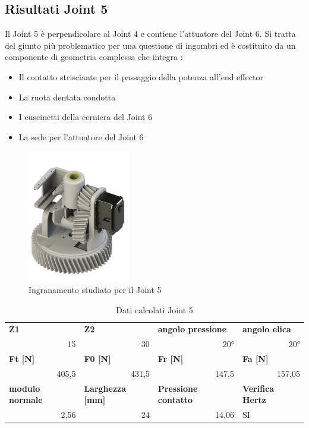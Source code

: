 \documentclass[%
corpo=11pt,
twoside,
 stile=classica,
oldstyle,
greek,%
]{toptesi}
\begin{document}
		\subsection{Risultati Joint 5}
		Il Joint 5 è perpendicolare al Joint 4 e contiene l'attuatore del Joint 6. Si tratta del giunto più problematico per una questione di ingombri ed è costituito da un componente di geometria complessa che integra :
		\begin{itemize}
			\item Il contatto strisciante per il passaggio della potenza all'end effector
			\item La ruota dentata condotta
			\item I cuscinetti della cerniera del Joint 6 
			\item La sede per l'attuatore del Joint 6 
		\end{itemize}
			\begin{figure} [H]
		\centering
		\includegraphics[width=0.4\textwidth]{Plots/POLSO2/wrist2.png}
		\caption{Ingranamento studiato per il Joint 5}
		\label{fig:wrist2}
	\end{figure} 
		\begin{table}[H]
			\centering
			\caption{Dati calcolati Joint 5}
			\begin{tabular}{rrrl}
				\multicolumn{1}{l}{\textbf{Z1}} & \multicolumn{1}{l}{\textbf{Z2}} & \multicolumn{1}{l}{\textbf{angolo pressione}} & \textbf{angolo elica} \\
				15    & 30    & 20°    & \multicolumn{1}{r}{20°} \\
				\multicolumn{1}{l}{\textbf{Ft [N]}} & \multicolumn{1}{l}{\textbf{F0 [N]}} & \multicolumn{1}{l}{\textbf{Fr [N]}} & \textbf{Fa [N]} \\
				405,5 & 431,5 & 147,5 & \multicolumn{1}{r}{157,05} \\
				\multicolumn{1}{l}{\textbf{modulo normale}} & \multicolumn{1}{l}{\textbf{Larghezza [mm]}} & \multicolumn{1}{l}{\textbf{Pressione contatto}} & \textbf{Verifica Hertz} \\
				2,56 & 24    & 14,06  & SI \\
			\end{tabular}%
			\label{tab:lewis2}%
		\end{table}%
	
\end{document}
